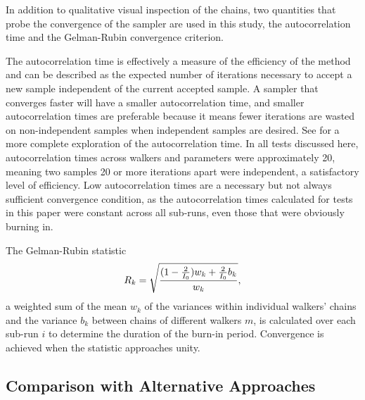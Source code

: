 In addition to qualitative visual inspection of the chains, two quantities that probe the convergence of the sampler are used in this study, the autocorrelation time and the Gelman-Rubin convergence criterion.  


The autocorrelation time is effectively a measure of the efficiency of the method and can be described as the expected number of iterations necessary to accept a new sample independent of the current accepted sample.  
A sampler that converges faster will have a smaller autocorrelation time, and smaller autocorrelation times are preferable because it means fewer iterations are wasted on non-independent samples when independent samples are desired.  
See \citet{Foreman-Mackey2013} for a more complete exploration of the autocorrelation time.  
In all tests discussed here, autocorrelation times across walkers and parameters were approximately 20, meaning two samples 20 or more iterations apart were independent, a satisfactory level of efficiency.  
Low autocorrelation times are a necessary but not always sufficient convergence condition, as the autocorrelation times calculated for tests in this paper were constant across all sub-runs, even those that were obviously burning in.  

The Gelman-Rubin statistic
\begin{equation}
\eqlabel{eq:gr}
R_{k} = \sqrt{\frac{(1-\frac{2}{I_{0}})w_{k}+\frac{2}{I_{0}}b_{k}}{w_{k}}},
\end{equation}
a weighted sum of the mean $w_{k}$ of the variances within individual walkers' chains and the variance $b_{k}$ between chains of different walkers $m$, is calculated over each sub-run $i$ to determine the duration of the burn-in period.  
Convergence is achieved when the statistic approaches unity.  

\subsection{Comparison with Alternative Approaches}

